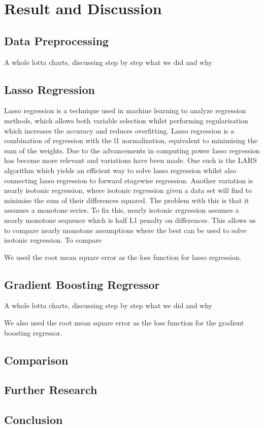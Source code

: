 \section{Result and Discussion}
\subsection{Data Preprocessing}
A whole lotta charts, discussing step by step what we did and why
\subsection{Lasso Regression}
Lasso regression is a technique used in machine learning to analyze regression methods, which allows both variable selection whilst performing regularisation which increases the accuracy and reduces overfitting\cite{tibshirani_1996}. Lasso regression is a combination of regression with the l1 normalization, equivalent to minimising the sum of the weights.  Due to the advancements in computing power lasso regression has become more relevant and variations have been made. One such is the LARS algorithm which yields an efficient way to solve lasso regression whilst also connecting lasso regression to forward stagewise regression. Another variation is nearly isotonic regression, where isotonic regression given a data set will find to minimise the sum of their differences squared. The problem with this is that it assumes a monotone series. To fix this, nearly isotonic regression assumes a nearly monotone sequence which is half L1 penalty on differences. This allows us to compare nearly monotone assumptions where the best can be used to solve isotonic regression.\newline
To compare 


We used the root mean square error as the loss function for lasso regression.
\subsection{Gradient Boosting Regressor}
A whole lotta charts, discussing step by step what we did and why

We also used the root mean square error as the loss function for the gradient boosting regressor.
\subsection{Comparison}

\subsection{Further Research}
\subsection{Conclusion}
